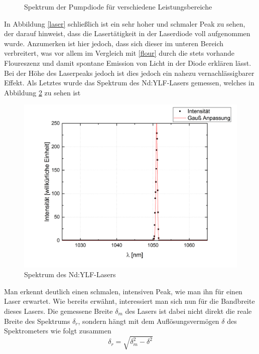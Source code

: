 \begin{figure}[H]
\begin{center}
		\caption{Spektrum der Pumpdiode für verschiedene Leistungsbereiche}
		\label{spek1}
	\end{center}
\end{figure}
In Abbildung \ref{laser} schließlich ist ein sehr hoher und schmaler Peak zu sehen, der darauf hinweist, dass die Lasertätigkeit in der Laserdiode voll aufgenommen wurde. Anzumerken ist hier jedoch, dass sich dieser im unteren Bereich verbreitert, was vor allem im Vergleich mit \ref{flour} durch die stets vorhande Floureszenz und damit spontane Emission von Licht in der Diode erklären lässt. Bei der Höhe des Laserpeaks jedoch ist dies jedoch ein nahezu vernachlässigbarer Effekt. \newline
Als Letztes wurde das Spektrum des Nd:YLF-Lasers gemessen, welches in  Abbildung \ref{lasery} zu sehen ist
\begin{figure}[H]
	\begin{center}
		\includegraphics[scale=.5]{Bilder/LaserY.png}
		\caption{Spektrum des Nd:YLF-Lasers}
		\label{lasery}
	\end{center}
\end{figure}
Man erkennt deutlich einen schmalen, intensiven Peak, wie man ihn für einen Laser erwartet. Wie bereits erwähnt, interessiert man sich nun für die Bandbreite dieses Lasers. Die gemessene Breite $\delta_m$ des Lasers ist dabei nicht direkt die reale Breite des Spektrums $\delta_r$, sondern hängt mit dem Auflösungsvermögen $\delta$ des Spektrometers wie folgt zusammen
\begin{equation}
\delta_r=\sqrt{\delta_m^2-\delta^2}
\label{breite}
\end{equation}
